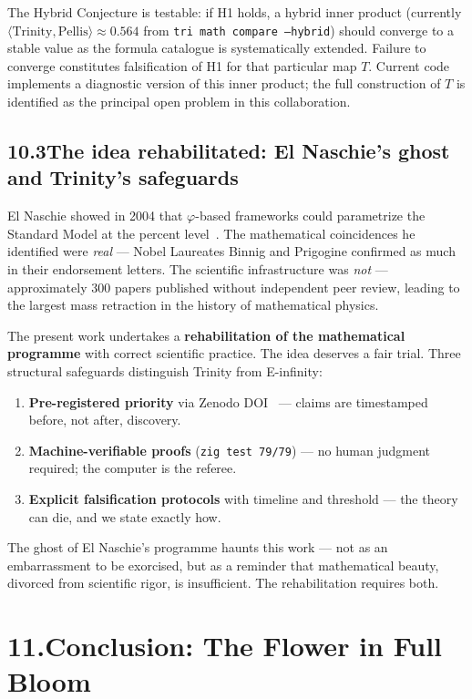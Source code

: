 \documentclass[10pt,a4paper]{article}
\begin{document}
The Hybrid Conjecture is testable: if H1 holds, a hybrid inner product (currently
$\langle \text{Trinity}, \text{Pellis}\rangle \approx 0.564$ from \texttt{tri math compare --hybrid})
should converge to a stable value as the formula catalogue is systematically extended.
Failure to converge constitutes falsification of H1 for that particular map $T$.
Current code implements a diagnostic version of this inner product; the full construction of $T$
is identified as the principal open problem in this collaboration.

\subsection*{10.3\quad The idea rehabilitated: El Naschie's ghost and Trinity's safeguards}

El Naschie showed in 2004 that $\varphi$-based frameworks could parametrize the Standard Model
at the percent level~\cite{naschie2004}. The mathematical coincidences he identified were
\emph{real} --- Nobel Laureates Binnig and Prigogine confirmed as much in their endorsement
letters. The scientific infrastructure was \emph{not} --- approximately 300 papers published
without independent peer review, leading to the largest mass retraction in the history of
mathematical physics.

The present work undertakes a \textbf{rehabilitation of the mathematical programme}
with correct scientific practice. The idea deserves a fair trial.
Three structural safeguards distinguish Trinity from E-infinity:
\begin{enumerate}
  \item \textbf{Pre-registered priority} via Zenodo DOI~\cite{trinity2024} ---
        claims are timestamped before, not after, discovery.
  \item \textbf{Machine-verifiable proofs} (\texttt{zig test 79/79}) ---
        no human judgment required; the computer is the referee.
  \item \textbf{Explicit falsification protocols} with timeline and threshold ---
        the theory can die, and we state exactly how.
\end{enumerate}
The ghost of El Naschie's programme haunts this work --- not as an embarrassment
to be exorcised, but as a reminder that mathematical beauty, divorced from
scientific rigor, is insufficient. The rehabilitation requires both.

\section*{11.\quad Conclusion: The Flower in Full Bloom}
\end{document}
